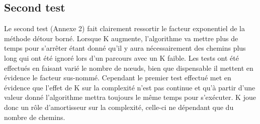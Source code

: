 \subsection{Second test}
Le second test (Annexe 2) fait clairement ressortir le facteur exponentiel de la méthode détour borné. Lorsque K augmente, l'algorithme va mettre plus de temps pour s'arrêter étant donné qu'il y aura nécessairement des chemins plus long qui ont été ignoré lors d'un parcours avec un K faible.
Les tests ont été effectués en faisant varié le nombre de nœuds, bien que dispensable il mettent en évidence le facteur sus-nommé. Cependant le premier test effectué met en évidence que l'effet de K sur la complexité n'est pas continue et qu'à partir d'une valeur donné l'algorithme mettra toujours le même temps pour s'exécuter. 
K joue donc un rôle d'amortisseur sur la complexité, celle-ci ne dépendant que du nombre de chemins.


